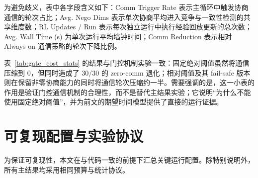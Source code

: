\documentclass[conference]{IEEEtran}
\begin{document}
\begin{table}[htbp]
  \centering
  \scriptsize
  \caption{Measured Cost Statistics for the Gate Mechanism Study (F1/F2/F5, 10 runs per function)}
  \label{tab:gate_cost_stats}
  \setlength{\tabcolsep}{2.5pt}
  \end{table}

为避免歧义，表中各字段含义如下：Comm Trigger Rate 表示主循环中触发协商通信的轮次占比；Avg. Nego Dims 表示单次协商平均进入竞争与一致性检测的共享维度数；RL Updates / Run 表示每次独立运行中执行经验回放更新的总次数；Avg. Wall Time (s) 为单次运行平均墙钟时间；Comm Reduction 表示相对 Always-on 通信策略的轮次下降比例。

表~\ref{tab:gate_cost_stats} 的结果与门控机制实验一致：固定绝对阈值虽然将通信压缩到 0，但同时造成了 $30/30$ 的 zero-comm 退化；相对阈值及其 fail-safe 版本则在保留非零协商能力的同时将通信轮次压缩约一半。需要强调的是，这一小表的作用是验证门控通信机制的合理性，而不是替代主结果实验；它说明“为什么不能使用固定绝对阈值”，并为前文的期望时间模型提供了直接的运行证据。

\section{可复现配置与实验协议}

为保证可复现性，本文在与代码一致的前提下汇总关键运行配置。除特别说明外，所有主结果均采用相同预算与统计协议。
\end{document}
